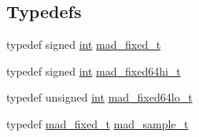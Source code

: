 \subsection*{Typedefs}
\begin{DoxyCompactItemize}
\item 
typedef signed \hyperlink{xmltok_8h_a5a0d4a5641ce434f1d23533f2b2e6653}{int} \hyperlink{lib-src_2libmad_2msvc_09_09_2mad_8h_a5086b0f25866d1a5d2511e1c9824dfe6}{mad\+\_\+fixed\+\_\+t}
\item 
typedef signed \hyperlink{xmltok_8h_a5a0d4a5641ce434f1d23533f2b2e6653}{int} \hyperlink{lib-src_2libmad_2msvc_09_09_2mad_8h_ae47027c34651060a730a7d8266c45307}{mad\+\_\+fixed64hi\+\_\+t}
\item 
typedef unsigned \hyperlink{xmltok_8h_a5a0d4a5641ce434f1d23533f2b2e6653}{int} \hyperlink{lib-src_2libmad_2msvc_09_09_2mad_8h_a739f4d59695c7a51dfeccc623d0fda80}{mad\+\_\+fixed64lo\+\_\+t}
\item 
typedef \hyperlink{libmad_2fixed_8h_a8a4b50d6d4d6827b7a8c871db1cbfd78}{mad\+\_\+fixed\+\_\+t} \hyperlink{lib-src_2libmad_2msvc_09_09_2mad_8h_a66d26474ecf238cb00458050afb95051}{mad\+\_\+sample\+\_\+t}
\end{DoxyCompactItemize}
